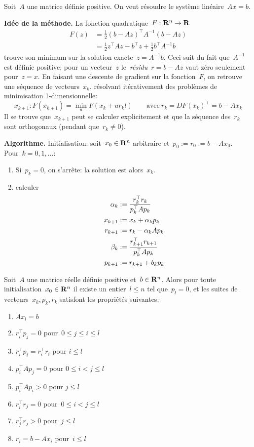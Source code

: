 Soit~$A$ une matrice définie positive. %
On veut résoudre le système linéaire~$Ax=b$.

{\bf Idée de la méthode.}
La fonction quadratique~$F:\mathbf{R}^n\to\mathbf{R}$
\begin{align*}
	F(z) &=\tfrac12(b-Az)^\top A^{-1}(b-Az)\\
	&=\tfrac12z^\top Az-b^\top z+\tfrac12b^\top A^{-1}b
\end{align*}
trouve son minimum sur la solution exacte~$z=A^{-1}b$.
Ceci suit du fait que~$A^{-1}$ est définie positive;
pour un vecteur~$z$ le~\emph{résidu}~$r=b-Az$ vaut zéro seulement pour~$z=x$.
En faisant une descente de gradient sur la fonction~$F$, on retrouve une
séquence  de vecteurs~$x_k$, résolvant itérativement des problèmes de
minimisation 1-dimensionnelle:
\[
	x_{k+1} : F(x_{k+1})=\min_u F(x_k+u r_kl)
	\qquad
	\mathrm{avec}\ r_k = DF(x_k)^\top=b-Ax_k
\]
Il se trouve que~$x_{k+1}$ peut se calculer explicitement et que la séquence
des~$r_k$ sont orthogonaux (pendant que~$r_k\neq0$).

{\bf Algorithme.}  Initialisation: soit~$x_0\in\mathbf{R}^n$ arbitraire
et~$p_0:=r_0:=b-Ax_0$.  Pour~$k=0,1,\ldots$:
\begin{enumerate}
	\item Si~$p_k=0$, on s'arrête: la solution est alors~$x_k$.
	\item calculer
		\begin{align*}
			\displaystyle
			\alpha_k &:= \frac{r_k^\top r_k}{p_k^\top Ap_k} \\
			x_{k+1} &:= x_k+\alpha_kp_k \\
			r_{k+1} &:= r_k-\alpha_kAp_k \\
			\beta_k &:= \frac{r_{k+1}^\top r_{k+1}}{p_k^\top Ap_k} \\
		p_{k+1} &:= r_{k+1}+b_kp_k
		\end{align*}
\end{enumerate}

%

\begin{exercice}
	Soit~$A$ une matrice réelle définie positive et~$b\in\mathbf{R}^n$.   Alors pour
	toute initialisation~$x_0\in\mathbf{R}^n$ il existe un entier~$l\le n$ tel
	que~$p_l=0$, et les suites de vecteurs~$x_k,p_k,r_k$ satisfont les
	propriétés suivantes:
	\begin{enumerate}
		\item $Ax_l=b$
		\item $r_i^\top p_j=0$ pour~$0\le j\le i\le l$
		\item $r_i^\top p_i=r_i^\top r_i$ pour $i\le l$
		\item $p_i^\top A p_j=0$ pour $0\le i< j\le l$
		\item $p_i^\top A p_i>0$ pour $j\le l$
		\item $r_i^\top r_j=0$ pour~$0\le i< j\le l$
		\item $r_j^\top r_j>0$ pour~$j\le l$
		\item $r_i=b-Ax_i$ pour~$i\le l$
	\end{enumerate}
\end{exercice}

